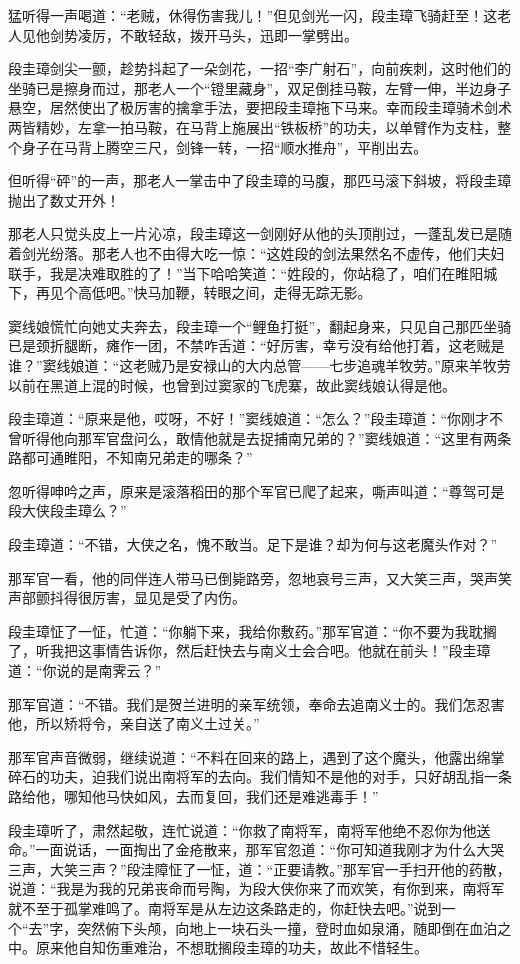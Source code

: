 \documentclass[12pt,oneside]{book}
\begin{document}
猛听得一声喝道：``老贼，休得伤害我儿！''但见剑光一闪，段圭璋飞骑赶至！这老人见他剑势凌厉，不敢轻敌，拨开马头，迅即一掌劈出。

段圭璋剑尖一颤，趁势抖起了一朵剑花，一招``李广射石''，向前疾刺，这时他们的坐骑已是擦身而过，那老人一个``镫里藏身''，双足倒挂马鞍，左臂一伸，半边身子悬空，居然使出了极厉害的擒拿手法，要把段圭璋拖下马来。幸而段圭璋骑术剑术两皆精妙，左拿一拍马鞍，在马背上施展出``铁板桥''的功夫，以单臂作为支柱，整个身子在马背上腾空三尺，剑锋一转，一招``顺水推舟''，平削出去。

但听得``砰''的一声，那老人一掌击中了段圭璋的马腹，那匹马滚下斜坡，将段圭璋抛出了数丈开外！

那老人只觉头皮上一片沁凉，段圭璋这一剑刚好从他的头顶削过，一蓬乱发已是随着剑光纷落。那老人也不由得大吃一惊：``这姓段的剑法果然名不虚传，他们夫妇联手，我是决难取胜的了！''当下哈哈笑道：``姓段的，你站稳了，咱们在睢阳城下，再见个高低吧。''快马加鞭，转眼之间，走得无踪无影。

窦线娘慌忙向她丈夫奔去，段圭璋一个``鲤鱼打挺''，翻起身来，只见自己那匹坐骑已是颈折腿断，瘫作一团，不禁咋舌道：``好厉害，幸亏没有给他打着，这老贼是谁？''窦线娘道：``这老贼乃是安禄山的大内总管------七步追魂羊牧劳。''原来羊牧劳以前在黑道上混的时候，也曾到过窦家的飞虎寨，故此窦线娘认得是他。

段圭璋道：``原来是他，哎呀，不好！''窦线娘道：``怎么？''段圭璋道：``你刚才不曾听得他向那军官盘问么，敢情他就是去捉捕南兄弟的？''窦线娘道：``这里有两条路都可通睢阳，不知南兄弟走的哪条？''

忽听得呻吟之声，原来是滚落稻田的那个军官已爬了起来，嘶声叫道：``尊驾可是段大侠段圭璋么？''

段圭璋道：``不错，大侠之名，愧不敢当。足下是谁？却为何与这老魔头作对？''

那军官一看，他的同伴连人带马已倒毙路旁，忽地哀号三声，又大笑三声，哭声笑声部颤抖得很厉害，显见是受了内伤。

段圭璋怔了一怔，忙道：``你躺下来，我给你敷药。''那军官道：``你不要为我耽搁了，听我把这事情告诉你，然后赶快去与南义士会合吧。他就在前头！''段圭璋道：``你说的是南霁云？''

那军官道：``不错。我们是贺兰进明的亲军统领，奉命去追南义士的。我们怎忍害他，所以矫将令，亲自送了南义土过关。''

那军官声音微弱，继续说道：``不料在回来的路上，遇到了这个魔头，他露出绵掌碎石的功夫，迫我们说出南将军的去向。我们情知不是他的对手，只好胡乱指一条路给他，哪知他马快如风，去而复回，我们还是难逃毒手！''

段圭璋听了，肃然起敬，连忙说道：``你救了南将军，南将军他绝不忍你为他送命。''一面说话，一面掏出了金疮散来，那军官忽道：``你可知道我刚才为什么大哭三声，大笑三声？''段洼障怔了一怔，道：``正要请教。''那军官一手扫开他的药散，说道：``我是为我的兄弟丧命而号陶，为段大侠你来了而欢笑，有你到来，南将军就不至于孤掌难鸣了。南将军是从左边这条路走的，你赶快去吧。''说到一个``去''字，突然俯下头颅，向地上一块石头一撞，登时血如泉涌，随即倒在血泊之中。原来他自知伤重难治，不想耽搁段圭璋的功夫，故此不惜轻生。
\end{document}
